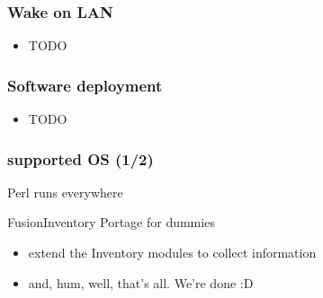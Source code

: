 \begin{frame}
    \frametitle{Wake on LAN}

    \begin{itemize}
        \item TODO
    \end{itemize}
\end{frame}

\begin{frame}
    \frametitle{Software deployment}

    \begin{itemize}
        \item TODO
    \end{itemize}
\end{frame}

\begin{frame}
    \frametitle{supported OS (1/2)}

    Perl runs everywhere

    \pause

    \begin{block}{FusionInventory Portage for dummies}
        \begin{itemize}
            \item extend the Inventory modules to collect information
            \item and, hum, well, that's all. We're done :D
        \end{itemize}
    \end{block}
\end{frame}


